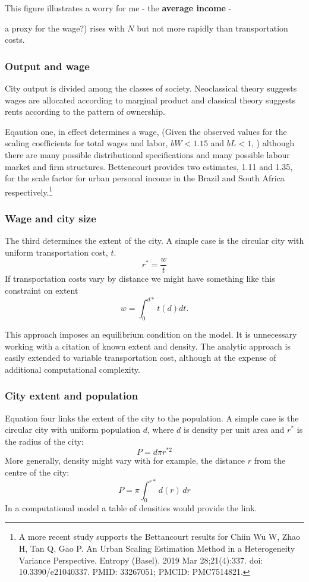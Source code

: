  This figure illustrates a worry for me - the \textbf{average income} - {a proxy for the wage?) rises with $N$ but not more rapidly than transportation costs.
 
\subsubsection{Output and wage}
City output is divided among the classes of society. Neoclassical theory suggests wages are allocated according to marginal product and classical theory suggests rents according to the pattern of ownership.

Eqaution one, in effect determines a wage, (Given the observed values for the scaling coefficients for total wages and labor, $bW < 1.15$ and $bL < 1$, )  although there are many possible distributional specifications and many possible labour market and firm structures. Bettencourt provides two  estimates,  1.11 and 1.35, for the scale factor for urban personal income in the Brazil and South Africa respectively.\footnote{A more recent  study supports the Bettancourt results for Chiin Wu W, Zhao H, Tan Q, Gao P. An Urban Scaling Estimation Method in a Heterogeneity Variance Perspective. Entropy (Basel). 2019 Mar 28;21(4):337. doi: 10.3390/e21040337. PMID: 33267051; PMCID: PMC7514821.} 

\subsubsection{Wage and city size}
The third determines the extent of the city. A simple case is the circular city with uniform transportation cost, $t$. \[r^*= \frac{w}{t}\]%
If transportation costs vary by  distance we might have something like this constraint on extent\[w=\int_0^{d*} t(d)dt.\]

This approach imposes an equilibrium condition on the model. It is unnecessary working with a citation of known extent and density. The analytic approach is easily extended to variable transportation cost, although at the expense of additional computational complexity.

\subsubsection{City extent and population}
Equation  four  links the extent of the city to the population. A simple case is the circular city with uniform population $d$, where $d$ is density per unit area and $r^*$ is the radius of the city: \[P=d\pi r^{*2}\] 
More generally, density might vary with for example, the distance $r$ from the centre of the city:
\[P=\pi \int_{0}^{r*}d(r)\,dr\] In a computational model a table of densities would provide the link.


}
